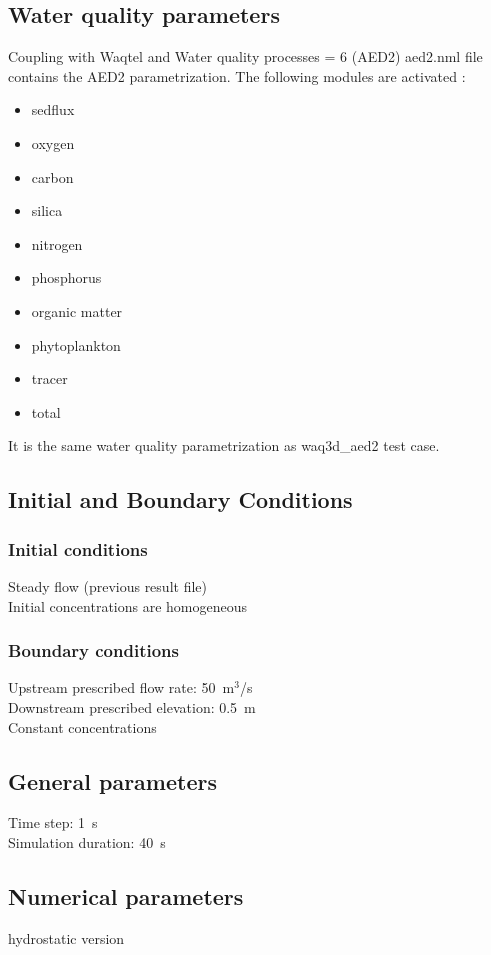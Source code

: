 \subsection{Water quality parameters}
Coupling with Waqtel and Water quality processes = 6 (AED2)
aed2.nml file contains the AED2 parametrization. The following modules are activated :
\begin{itemize}
	\item sedflux
	\item oxygen
	\item carbon
	\item silica
	\item nitrogen
	\item phosphorus
	\item organic matter
	\item phytoplankton
	\item tracer
	\item total
\end{itemize}
It is the same water quality parametrization as waq3d\_aed2 test case.
%
\subsection{Initial and Boundary Conditions}
%
\subsubsection{Initial conditions}
%
Steady flow (previous result file)\\
Initial concentrations are homogeneous\\
%
\subsubsection{Boundary conditions}
%
Upstream prescribed flow rate: 50~m$^3$/s\\
Downstream prescribed elevation: 0.5~m\\
Constant concentrations\\

%
\subsection{General parameters}
%
Time step: 1~s\\
Simulation duration: 40~s
%

\subsection{Numerical parameters}
%
hydrostatic version\\
%

